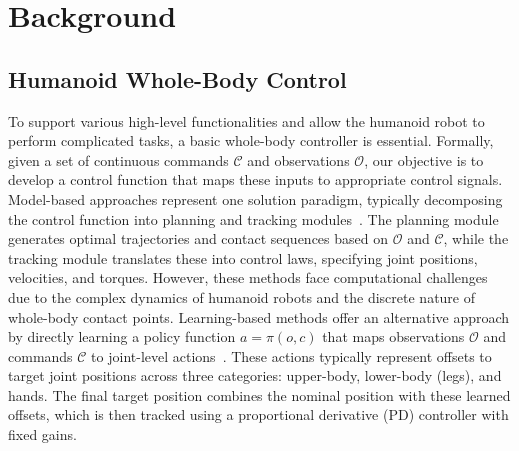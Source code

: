 \section{Background}
\subsection{Humanoid Whole-Body Control}
To support various high-level functionalities and allow the humanoid robot to perform complicated tasks, a basic whole-body controller is essential.
Formally, given a set of continuous commands $\mathcal{C}$ and observations $\mathcal{O}$, our objective is to develop a control function that maps these inputs to appropriate control signals.
Model-based approaches represent one solution paradigm, typically decomposing the control function into planning and tracking modules~\citep{nolinearMPC2023, 2023troBiConMP}. The planning module generates optimal trajectories and contact sequences based on $\mathcal{O}$ and $\mathcal{C}$, while the tracking module translates these into control laws, specifying joint positions, velocities, and torques. However, these methods face computational challenges due to the complex dynamics of humanoid robots and the discrete nature of whole-body contact points. 
Learning-based methods offer an alternative approach by directly learning a policy function $a=\pi(o,c)$ that maps observations $\mathcal{O}$ and commands $\mathcal{C}$ to joint-level actions~\citep{2021BipedalPeriodicReward}. These actions typically represent offsets to target joint positions across three categories: upper-body, lower-body (legs), and hands. The final target position combines the nominal position with these learned offsets, which is then tracked using a proportional derivative (PD) controller with fixed gains.

